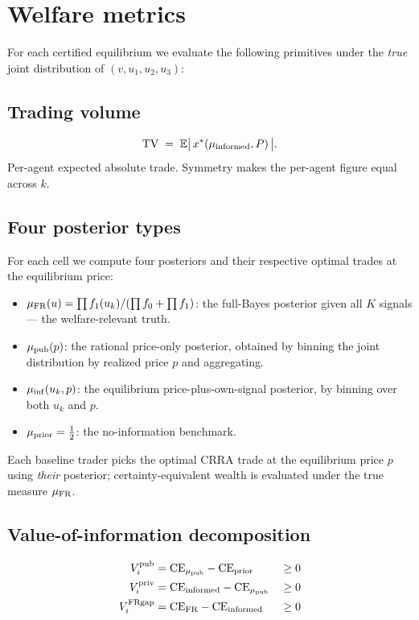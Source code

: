 \documentclass[11pt]{article}
\newcommand{\E}{\mathbb{E}}
\newcommand{\1}{\mathbf{1}}
\newcommand{\Vipub}{V_{i}^{\rm pub}}
\newcommand{\Vipriv}{V_{i}^{\rm priv}}
\newcommand{\ViFR}{V_{i}^{\rm FRgap}}
\begin{document}
\section{Welfare metrics}

For each certified equilibrium we evaluate the following primitives
under the \emph{true} joint distribution of $(v, u_1, u_2, u_3)$:

\subsection{Trading volume}

\begin{equation}
\mathrm{TV} \;=\; \E\bigl|\,x^*(\mu_{\rm informed}, P)\,\bigr|.
\end{equation}
Per-agent expected absolute trade.  Symmetry makes the per-agent figure
equal across $k$.

\subsection{Four posterior types}

For each cell we compute four posteriors and their respective optimal
trades at the equilibrium price:
\begin{itemize}
\item $\mu_{\rm FR}(u) = \prod f_1(u_k) / (\prod f_0 + \prod f_1)$:
the full-Bayes posterior given all $K$ signals --- the welfare-relevant truth.
\item $\mu_{\rm pub}(p)$: the rational price-only posterior, obtained by
binning the joint distribution by realized price $p$ and aggregating.
\item $\mu_{\rm inf}(u_k, p)$: the equilibrium price-plus-own-signal
posterior, by binning over both $u_k$ and $p$.
\item $\mu_{\rm prior} = \tfrac12$: the no-information benchmark.
\end{itemize}

Each baseline trader picks the optimal CRRA trade at the equilibrium
price $p$ using \emph{their} posterior; certainty-equivalent wealth is
evaluated under the true measure $\mu_{\rm FR}$.

\subsection{Value-of-information decomposition}

\begin{align}
\Vipub  &= \mathrm{CE}_{\mu_{\rm pub}} - \mathrm{CE}_{\rm prior}      &&\ge 0 \\
\Vipriv &= \mathrm{CE}_{\rm informed} - \mathrm{CE}_{\mu_{\rm pub}}    &&\ge 0 \\
\ViFR   &= \mathrm{CE}_{\rm FR} - \mathrm{CE}_{\rm informed}          &&\ge 0
\end{align}
\end{document}
